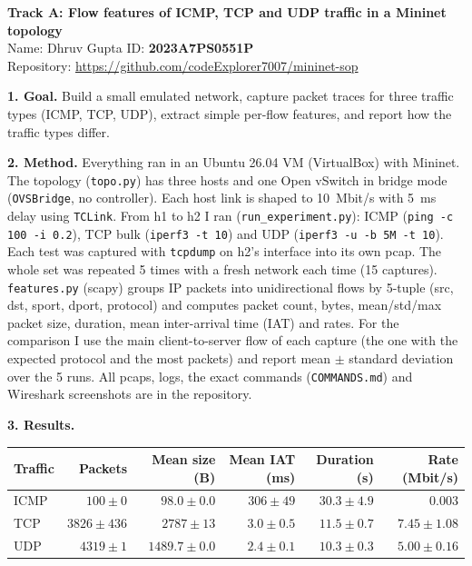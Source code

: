 \documentclass[10pt,a4paper]{article}
\begin{document}
{\large\textbf{Track A: Flow features of ICMP, TCP and UDP traffic in a Mininet topology}}\\
Name: Dhruv Gupta \quad ID: \textbf{2023A7PS0551P}\\
Repository: \url{https://github.com/codeExplorer7007/mininet-sop}

\textbf{1. Goal.}
Build a small emulated network, capture packet traces for three traffic types (ICMP, TCP, UDP), extract simple per-flow features, and report how the traffic types differ.

\textbf{2. Method.}
Everything ran in an Ubuntu 26.04 VM (VirtualBox) with Mininet. The topology (\texttt{topo.py}) has three hosts and one Open vSwitch in bridge mode (\texttt{OVSBridge}, no controller). Each host link is shaped to 10~Mbit/s with 5~ms delay using \texttt{TCLink}. From h1 to h2 I ran (\texttt{run\_experiment.py}): ICMP (\texttt{ping -c 100 -i 0.2}), TCP bulk (\texttt{iperf3 -t 10}) and UDP (\texttt{iperf3 -u -b 5M -t 10}). Each test was captured with \texttt{tcpdump} on h2's interface into its own pcap. The whole set was repeated 5 times with a fresh network each time (15 captures).
\texttt{features.py} (scapy) groups IP packets into unidirectional flows by 5-tuple (src, dst, sport, dport, protocol) and computes packet count, bytes, mean/std/max packet size, duration, mean inter-arrival time (IAT) and rates. For the comparison I use the main client-to-server flow of each capture (the one with the expected protocol and the most packets) and report mean $\pm$ standard deviation over the 5 runs. All pcaps, logs, the exact commands (\texttt{COMMANDS.md}) and Wireshark screenshots are in the repository.

\textbf{3. Results.}

\begin{center}
\small
\begin{tabular}{|l|r|r|r|r|r|}
\hline
Traffic & Packets & Mean size (B) & Mean IAT (ms) & Duration (s) & Rate (Mbit/s) \\
\hline
ICMP & $100 \pm 0$ & $98.0 \pm 0.0$ & $306 \pm 49$ & $30.3 \pm 4.9$ & $0.003$ \\
TCP  & $3826 \pm 436$ & $2787 \pm 13$ & $3.0 \pm 0.5$ & $11.5 \pm 0.7$ & $7.45 \pm 1.08$ \\
UDP  & $4319 \pm 1$ & $1489.7 \pm 0.0$ & $2.4 \pm 0.1$ & $10.3 \pm 0.3$ & $5.00 \pm 0.16$ \\
\hline
\end{tabular}
\end{center}
\end{document}
